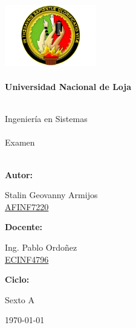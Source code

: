 \documentclass{report}
\begin{document}


\newcommand{\titulo}{ Universidad Nacional de Loja \\ \ \\ \begin{centering} Ingeniería en Sistemas \\ \ \\ Examen\\ \ \\ \end{centering}}
\newcommand{\fecha}{\today}




\pagestyle{empty}


\begin{center}\includegraphics[height=3cm, width=4cm]{unl}\end{center}


\Huge\bf\titulo
\raggedright\bf{Autor:}
\begin{center}
\rm Stalin Geovanny Armijos\\
\href{http://www.iralis.org/?q=node%2F10&paso=10&letra=&id=7220}{AFINF7220}
\end{center}

\raggedright\textbf{Docente:\\}
\begin{center}
\rm Ing. Pablo Ordoñez\\
\href{http://www.iralis.org/?q=node%2F10&paso=10&letra=O&id=4796}{ECINF4796}
\end{center} 

\raggedright\bf{Ciclo:}
\begin{center}
\rm Sexto A
\end{center}

\begin{center}


\huge\rm\fecha
\end{center}
\end{document}
